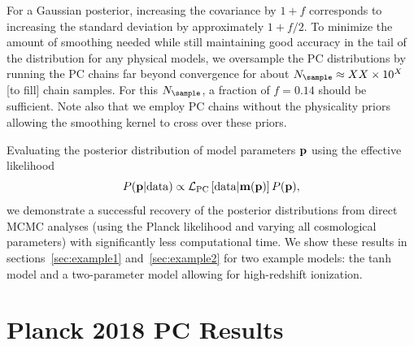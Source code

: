\documentclass[prd,twocolumn,amsmath,amssymb,floatfix,superscriptaddress,nofootinbib]{revtex4-1}
\begin{document}
For a Gaussian posterior, increasing the covariance by $1+f$ corresponds to increasing the standard deviation by approximately $1+f/2$. To minimize the amount of smoothing needed while still maintaining good accuracy in the tail of the distribution for any physical models, we oversample the PC distributions by running the PC chains far beyond convergence for about $N_{\sample} \approx XX \times 10^{X}$ [to fill] chain samples. For this $N_{\sample}$, a fraction of $f = 0.14$ should be sufficient. Note also that we employ PC chains without the physicality priors allowing the smoothing kernel to cross over these priors. 

Evaluating the posterior distribution of model parameters $\bf p$ using the effective likelihood
\begin{equation}
P({\bf p}| {\rm data}) \propto {\cal L}_{\rm PC}\left[ {\rm data}|\mathbf{m}(\bf p) \right] P(\bf p),
\end{equation}
we demonstrate a successful recovery of the posterior distributions from direct MCMC analyses (using the Planck likelihood and varying all cosmological parameters) with significantly less computational time. We show these results in sections~\ref{sec:example1} and~\ref{sec:example2} for two example models: the tanh model and a two-parameter model allowing for high-redshift ionization. 






\section{Planck 2018 PC Results}
\label{sec:results}
\end{document}
